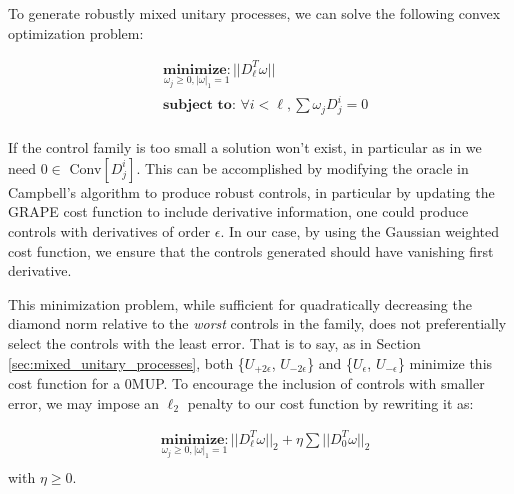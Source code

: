 \documentclass[aps,nofootinbib,pra,notitlepage,twocolumn]{revtex4-1}
\begin{document}
To generate robustly mixed unitary processes, we can solve the following convex optimization problem:

\begin{equation}\label{eq:minimization}
  \begin{split}
    &\underset{\omega_j\geq0, |\omega|_1=1}{\textbf{minimize}: } ||D_{\ell}^T\omega||\\
    &\textbf{subject to: } \forall i<\ell, \sum \omega_jD_j^i=0\\
  \end{split}
\end{equation}

If the control family is too small a solution won't exist, in particular as in \cite{Campbell2017} we need  $0\in $ Conv$[D_j^i]$.  This can be accomplished by modifying the oracle in Campbell's algorithm to produce robust controls, in particular by updating the GRAPE cost function to include derivative information, one could produce controls with derivatives of order $\epsilon$. In our case, by using the Gaussian weighted cost function, we ensure that the controls generated should have vanishing first derivative.

This minimization problem, while sufficient for quadratically decreasing the diamond norm relative to the \textit{worst} controls in the family, does not preferentially select the controls with the least error. That is to say, as in Section \ref{sec:mixed_unitary_processes}, both \{$U_{+2\epsilon}$, $U_{-2\epsilon}$\} and \{$U_{\epsilon}$, $U_{-\epsilon}$\} minimize this cost function for a 0MUP. To encourage the inclusion of controls with smaller error, we may impose an $\ell_2$ penalty to our cost function by rewriting it as:

\begin{equation}\label{eq:minimization_l2}
  \begin{split}
    &\underset{\omega_j\geq0, |\omega|_1=1}{\textbf{minimize}: } ||D_{\ell}^T\omega||_2 + \eta\sum||D_0^T\omega||_2\\
  \end{split}
\end{equation}
with $\eta \geq 0$. 
\end{document}

